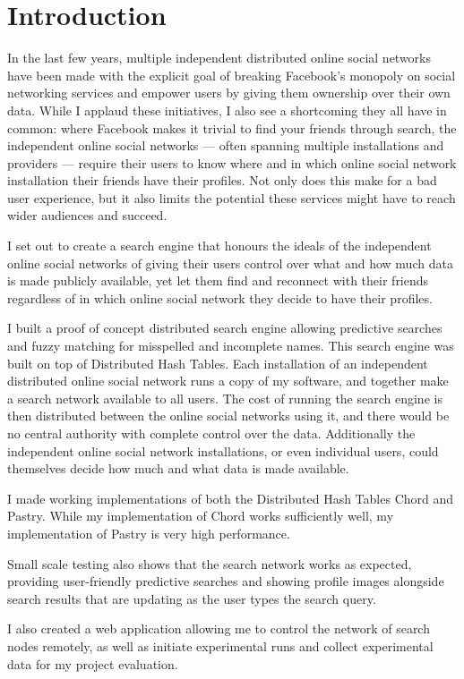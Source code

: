


\chapter{Introduction}
In the last few years, multiple independent distributed online social networks have been made with the explicit goal of breaking Facebook's monopoly on social networking services and empower users by giving them ownership over their own data.
While I applaud these initiatives, I also see a shortcoming they all have in common: where Facebook makes it trivial to find your friends through search, the independent online social networks --- often spanning multiple installations and providers --- require their users to know where and in which online social network installation their friends have their profiles. Not only does this make for a bad user experience, but it also limits the potential these services might have to reach wider audiences and succeed.

I set out to create a search engine that honours the ideals of the independent online social networks of giving their users control over what and how much data is made publicly available, yet let them find and reconnect with their friends regardless of in which online social network they decide to have their profiles.

I built a proof of concept distributed search engine allowing predictive searches and fuzzy matching for misspelled and incomplete names. This search engine was built on top of Distributed Hash Tables. Each installation of an independent distributed online social network runs a copy of my software, and together make a search network available to all users. The cost of running the search engine is then distributed between the online social networks using it, and there would be no central authority with complete control over the data. Additionally the independent online social network installations, or even individual users, could themselves decide how much and what data is made available.

I made working implementations of both the Distributed Hash Tables Chord and Pastry. While my implementation of Chord works sufficiently well, my implementation of Pastry is very high performance.

Small scale testing also shows that the search network works as expected, providing user-friendly predictive searches and showing profile images alongside search results that are updating as the user types the search query.

I also created a web application allowing me to control the network of search nodes remotely, as well as initiate experimental runs and collect experimental data for my project evaluation.
